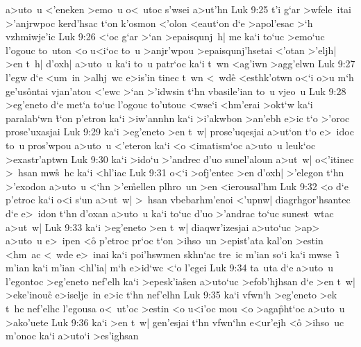 a>uto~u
<'eneken
>emo~u
o<~utoc
s'wsei
a>ut'hn\bibvsend
\vs Luk 9:25
t'i
g`ar
>wfele~itai
>'anjrwpoc
kerd'hsac
t`on
k'osmon
<'olon
<eaut`on
d`e
>apol'esac
>`h
vzhmiwje'ic\bibvsend
\vs Luk 9:26
<`oc
g`ar
>`an
>epaisqunj~h|
me
ka`i
to`uc
>emo`uc
l'ogouc
to~uton
<o
u<i`oc
to~u
>anjr'wpou
>epaisqunj'hsetai
<'otan
>'eljh|
>en
t~h|
d'oxh|
a>uto~u
ka`i
to~u
patr`oc
ka`i
t~wn
<ag'iwn
>agg'elwn\bibvsend
\vs Luk 9:27
l'egw
d`e
<um~in
>alhj~wc
e>is'in
tinec
t~wn
<~wde\r{}
<esthk'otwn
o<`i
o>u
m`h
ge'us\r{o}ntai
vjan'atou
<'ewc
>`an
>'idwsin
t`hn
vbasile'ian
to~u
vjeo~u\bibvsend
\vs Luk 9:28
>eg'eneto
d`e
met`a
to`uc
l'ogouc
to'utouc
<wse`i
<hm'erai
>okt`w
ka`i
paralab`wn
\r{t}`on
p'etron
ka`i
>iw'annhn
ka`i
>i'akwbon
>an'ebh
e>ic
t`o
>'oroc
prose'uxasjai\bibvsend
\vs Luk 9:29
ka`i
>eg'eneto
>en
t~w|
prose'uqesjai
a>ut`on
t`o
e>~idoc
to~u
pros'wpou
a>uto~u
<'eteron
ka`i
<o
<imatism`oc
a>uto~u
leuk`oc
>exastr'aptwn\bibvsend
\vs Luk 9:30
ka`i
>ido`u
>'andrec
d'uo
sunel'aloun
a>ut~w|
o<'itinec
>~hsan
mw\r{s}~hc
ka`i
<hl'iac\bibvsend
\vs Luk 9:31
o<`i
>ofj'entec
>en
d'oxh|
>'elegon
t`hn
>'exodon
a>uto~u
<`hn
>'e\r{m}ellen
plhro~un
>en
<ierousal'hm\bibvsend
\vs Luk 9:32
<o
d`e
p'etroc
ka`i
o<i
s`un
a>ut~w|
>~hsan
vbebarhm'enoi
<'upnw|
diagrhgor'hsantec
d`e
e>~idon
t`hn
d'oxan
a>uto~u
ka`i
to`uc
d'uo
>'andrac
to`uc
sunest~wtac
a>ut~w|\bibvsend
\vs Luk 9:33
ka`i
>eg'eneto
>en
t~w|
diaqwr'izesjai
a>uto`uc
>ap>
a>uto~u
e>~ipen
<o\r{}
p'etroc
pr`oc
t`on
>ihso~un
>epist'ata
kal'on
>estin
<hm~ac
<~wde
e>~inai
ka`i
poi'hswmen
skhn`ac
tre~ic
m'ian
so`i
ka`i
mwse~i\r{}
m'ian
ka`i
m'ian
<hl'ia|
m`h
e>id`wc
<`o
l'egei\bibvsend
\vs Luk 9:34
ta~uta
d`e
a>uto~u
l'egontoc
>eg'eneto
nef'elh
ka`i
>epesk'ia\r{s}en
a>uto`uc
>efob'hjhsan
d`e
>en
t~w|
>eke'inouc\r{}
e>iselje~in
e>ic
t`hn
nef'elhn\bibvsend
\vs Luk 9:35
ka`i
vfwn`h
>eg'eneto
>ek
t~hc
nef'elhc
l'egousa
o<~ut'oc
>estin
<o
u<i'oc
mou
<o
>aga\r{p}ht`oc
a>uto~u
>ako'uete\bibvsend
\vs Luk 9:36
ka`i
>en
t~w|
gen'esjai
t`hn
vfwn`hn
e<ur'ejh
<o\r{}
>ihso~uc
m'onoc
ka`i
a>uto`i
>es'ighsan
